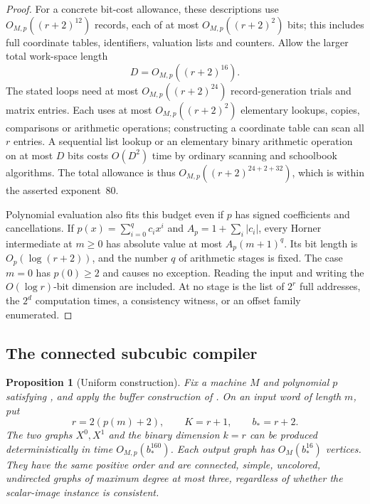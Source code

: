 \documentclass[11pt]{article}
\newtheorem{proposition}[theorem]{Proposition}
\theoremstyle{definition}
\begin{document}
\begin{proof}
For a concrete bit-cost allowance, these descriptions use
$O_{M,p}((r+2)^{12})$ records, each of at most
$O_{M,p}((r+2)^2)$ bits; this includes full coordinate tables, identifiers,
valuation lists and counters. Allow the larger total work-space length
\[
 D=O_{M,p}((r+2)^{16}).
\]
The stated loops need at most $O_{M,p}((r+2)^{24})$ record-generation trials
and matrix entries. Each uses at most $O_{M,p}((r+2)^2)$ elementary lookups,
copies, comparisons or arithmetic operations; constructing a coordinate
table can scan all $r$ entries. A sequential list lookup or an elementary
binary arithmetic operation on at most $D$ bits costs $O(D^2)$ time by
ordinary scanning and schoolbook algorithms. The total allowance is thus
$O_{M,p}((r+2)^{24+2+32})$, which is within the asserted exponent~80.

Polynomial evaluation also fits this budget even if $p$ has signed
coefficients and cancellations. If $p(x)=\sum_{i=0}^q c_i x^i$ and
$A_p=1+\sum_i|c_i|$, every Horner intermediate at $m\ge0$ has absolute value
at most $A_p(m+1)^q$. Its bit length is $O_p(\log(r+2))$, and the number
$q$ of arithmetic stages is fixed. The case $m=0$ has $p(0)\ge2$ and causes
no exception. Reading the input and writing the $O(\log r)$-bit dimension
are included. At no stage is the list of $2^r$ full addresses, the
$2^d$ computation times, a consistency witness, or an offset family
enumerated.
\end{proof}


\subsection{The connected subcubic compiler}

\begin{proposition}[Uniform construction]
\label{prop:uniform-construction}
Fix a machine \(M\) and polynomial \(p\) satisfying
, and apply the buffer construction
of .  On an input
word of length $m$, put
\[
 r=2(p(m)+2),\qquad K=r+1,\qquad b_*=r+2.
\]
The two graphs $X^0,X^1$ and the binary dimension $k=r$ can be produced
deterministically in time $O_{M,p}(b_*^{160})$.  Each output graph has
$O_M(b_*^{16})$ vertices.  They have the same positive order and are
connected, simple, uncolored, undirected graphs of maximum degree at most
three, regardless of whether the scalar-image instance is consistent.
\end{proposition}
\end{document}

